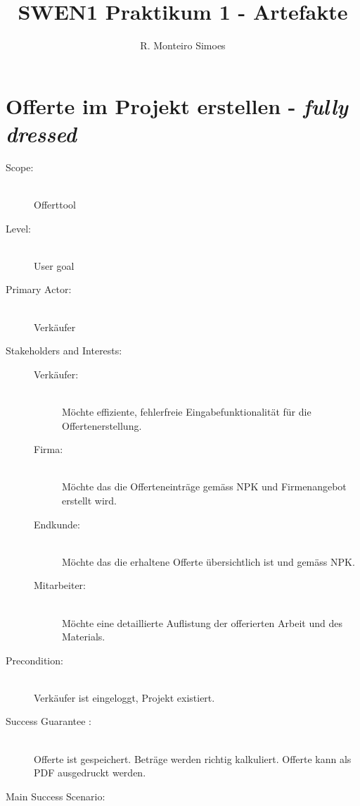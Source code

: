 \documentclass[journal]{combine}
\begin{document}
	
	\title{SWEN1 Praktikum 1 - Artefakte}
	\author{ R. Monteiro Simoes}
	\maketitle

	\newpage

	\tableofcontents

	\newpage
	
	\section{Offerte im Projekt erstellen - \emph{fully dressed}}
	
	\begin{description}
		\item[Scope:] \hfill  \\Offerttool
		\item[Level:] \hfill \\User goal
		\item[Primary Actor:] \hfill \\Verkäufer
		\item[Stakeholders and Interests:] \hfill 
		\begin{description}
			\item[Verkäufer:]\hfill \\Möchte effiziente, fehlerfreie Eingabefunktionalität 
			für die Offertenerstellung.
			\item[Firma:]\hfill \\Möchte das die Offerteneinträge gemäss 
			NPK und Firmenangebot erstellt wird.
			\item[Endkunde:]\hfill \\Möchte das die erhaltene Offerte 
			übersichtlich ist und gemäss NPK.
			\item[Mitarbeiter:]\hfill \\Möchte eine detaillierte Auflistung der
			offerierten Arbeit und des Materials.  
		\end{description}
		\item[Precondition:] \hfill \\Verkäufer ist eingeloggt, Projekt existiert. 
		\item[Success Guarantee :] \hfill \\Offerte ist gespeichert. Beträge
		werden richtig kalkuliert. Offerte kann als PDF ausgedruckt werden. 
		\item[Main Success Scenario:] \hfill  
		\begin{enumerate}

\end{enumerate}
\end{description}
\end{document}

